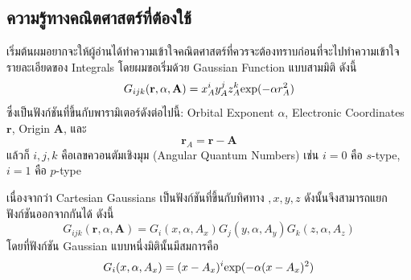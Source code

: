 \subsection{ความรู้ทางคณิตศาสตร์ที่ต้องใช้}

เริ่มต้นผมอยากจะให้ผู้อ่านได้ทำความเข้าใจคณิตศาสตร์ที่ควรจะต้องทราบก่อนที่จะไปทำความเข้าใจรายละเอียดของ Integrals โดยผมขอเริ่มด้วย
Gaussian Function แบบสามมิติ ดังนี้
%
\begin{equation}
  G_{ijk}(\mathbf{r}, \alpha, \mathbf{A})
  =
  x_A^i y_A^j z_A^k \hbox{exp}(-\alpha r_A^2)
\end{equation}
%
ซึ่งเป็นฟังก์ชันที่ขึ้นกับพารามิเตอร์ดังต่อไปนี้: Orbital Exponent $\alpha$, Electronic Coordinates $\mathbf{r}$, Origin $\mathbf{A}$, และ
%
\begin{equation}
  \mathbf{r}_A
  =
  \mathbf{r} - \mathbf{A}
\end{equation}
%
แล้วก็ $i,j,k$ คือเลขควอนตัมเชิงมุม (Angular Quantum Numbers) เช่น $i=0$ คือ $s$-type, $i=1$ คือ $p$-type

เนื่องจากว่า Cartesian Gaussians เป็นฟังก์ชันที่ขึ้นกับทิศทาง $,x ,y, z$ ดังนั้นจึงสามารถแยกฟังก์ชันออกจากกันได้ ดังนี้
%
\begin{equation}
  G_{ijk}(\mathbf{r}, \alpha, \mathbf{A})
  =
  G_i(x,\alpha,A_x)G_j(y,\alpha,A_y)G_k(z,\alpha,A_z)
\end{equation}
%
โดยที่ฟังก์ชัน Gaussian แบบหนึ่งมิตินั้นมีสมการคือ
%
\begin{equation}
  G_i(x,\alpha,A_x)
  =
  (x - A_x)^i \hbox{exp}(-\alpha(x-A_x)^2)
\end{equation}

